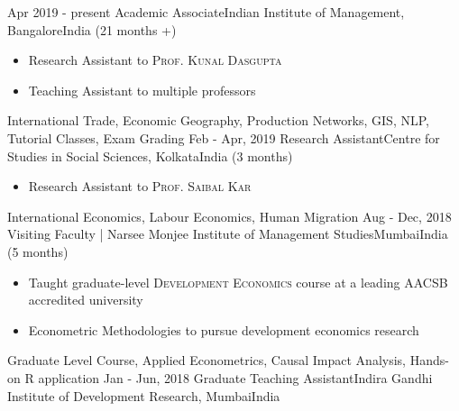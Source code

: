 %
%
%


\begin{experiences}

  \texperience
    {Apr 2019 - present}   {Academic Associate}{Indian Institute of Management, Bangalore}{India}
    {(21 months +)} {
                      \begin{itemize}
                        \item Research Assistant to \textsc{Prof. Kunal Dasgupta}                    
                        \item Teaching Assistant to multiple professors                    
                      \end{itemize}
                    }
                    {International Trade, Economic Geography, Production Networks, GIS, NLP, Tutorial Classes, Exam Grading}
\emptySeparator
  \texperience
    {Feb - Apr, 2019}   {Research Assistant}{Centre for Studies in Social Sciences, Kolkata}{India}
    {(3 months)} {
                      \begin{itemize}
                        \item Research Assistant to \textsc{Prof. Saibal Kar}
                      \end{itemize}
                    }
                    {International Economics, Labour Economics, Human Migration}
\emptySeparator
  \texperience
    {Aug - Dec, 2018}   {Visiting Faculty | Narsee Monjee Institute of Management Studies}{Mumbai}{India}
    {(5 months)} {
                      \begin{itemize}
                        \item Taught graduate-level \textsc{Development Economics} course at a leading AACSB accredited university
                        \item Econometric Methodologies to pursue development economics research
                      \end{itemize}
                    }
                    {Graduate Level Course, Applied Econometrics, Causal Impact Analysis, Hands-on R application}
\emptySeparator
  \texperience
    {Jan - Jun, 2018}   {Graduate Teaching Assistant}{Indira Gandhi Institute of Development Research, Mumbai}{India}

\end{experiences}
